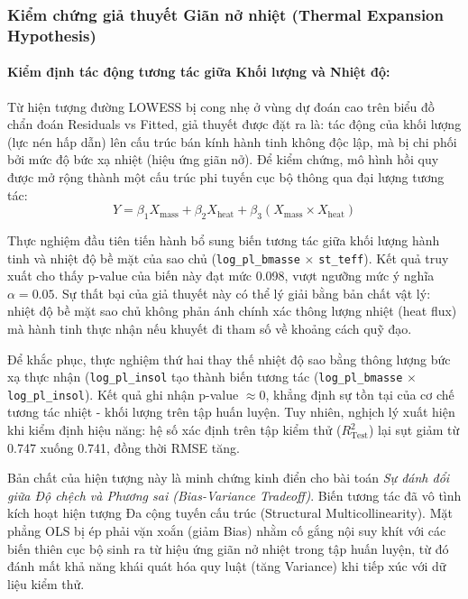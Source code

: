 \subsubsection{Kiểm chứng giả thuyết Giãn nở nhiệt (Thermal Expansion Hypothesis)}

\paragraph{Kiểm định tác động tương tác giữa Khối lượng và Nhiệt độ:}
Từ hiện tượng đường LOWESS bị cong nhẹ ở vùng dự đoán cao trên biểu đồ chẩn đoán Residuals vs Fitted, 
giả thuyết được đặt ra là: tác động của khối lượng (lực nén hấp dẫn) lên cấu trúc bán kính hành tinh 
không độc lập, mà bị chi phối bởi mức độ bức xạ nhiệt (hiệu ứng giãn nở). Để kiểm chứng, mô hình hồi 
quy được mở rộng thành một cấu trúc phi tuyến cục bộ thông qua đại lượng tương tác:
\begin{equation}
    Y = \beta_1 X_{\text{mass}} + \beta_2 X_{\text{heat}} + \beta_3 (X_{\text{mass}} \times X_{\text{heat}})
\end{equation}

Thực nghiệm đầu tiên tiến hành bổ sung biến tương tác giữa khối lượng hành tinh và nhiệt độ bề mặt 
của sao chủ (\texttt{log\_pl\_bmasse} $\times$ \texttt{st\_teff}). Kết quả truy xuất cho thấy p-value 
của biến này đạt mức 0.098, vượt ngưỡng mức ý nghĩa $\alpha = 0.05$. Sự thất bại của giả thuyết này 
có thể lý giải bằng bản chất vật lý: nhiệt độ bề mặt sao chủ không phản ánh chính xác thông lượng 
nhiệt (heat flux) mà hành tinh thực nhận nếu khuyết đi tham số về khoảng cách quỹ đạo.

Để khắc phục, thực nghiệm thứ hai thay thế nhiệt độ sao bằng thông lượng bức xạ thực nhận (\texttt{log\_pl\_insol} 
tạo thành biến tương tác (\texttt{log\_pl\_bmasse} $\times$ \texttt{log\_pl\_insol}). Kết quả ghi 
nhận p-value $\approx 0$, khẳng định sự tồn tại của cơ chế tương tác nhiệt - khối lượng trên tập 
huấn luyện. Tuy nhiên, nghịch lý xuất hiện khi kiểm định hiệu năng: hệ số xác định trên tập kiểm thử 
($R^2_{\text{Test}}$) lại sụt giảm từ 0.747 xuống 0.741, đồng thời RMSE tăng.

Bản chất của hiện tượng này là minh chứng kinh điển cho bài toán \emph{Sự đánh đổi giữa Độ chệch và 
Phương sai (Bias-Variance Tradeoff)}. Biến tương tác đã vô tình kích hoạt hiện tượng Đa cộng tuyến 
cấu trúc (Structural Multicollinearity). Mặt phẳng OLS bị ép phải vặn xoắn (giảm Bias) nhằm cố gắng 
nội suy khít với các biến thiên cục bộ sinh ra từ hiệu ứng giãn nở nhiệt trong tập huấn luyện, từ đó 
đánh mất khả năng khái quát hóa quy luật (tăng Variance) khi tiếp xúc với dữ liệu kiểm thử.

